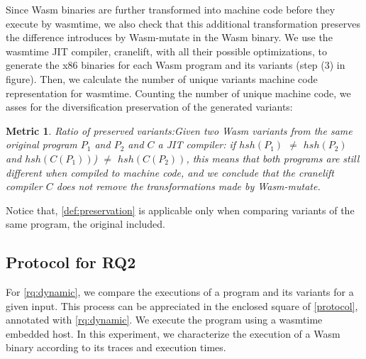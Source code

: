 \documentclass[sigplan,screen]{acmart}
\newcommand{\tool}{Wasm-mutate\xspace}
\newcommand{\wasm}{Wasm\xspace}
\newtheorem{metric}{Metric}
\begin{document}
Since \wasm binaries are further transformed into machine code before they execute by wasmtime, we also check that this additional transformation preserves the difference introduces by \tool in the \wasm binary. 
We use the wasmtime JIT compiler, cranelift, with all their possible optimizations, to generate the x86 binaries for each \wasm program and its variants  (step (3) in figure). 
Then, we calculate the number of unique variants machine code representation for wasmtime.
Counting the number of unique machine code, we asses for the diversification preservation of the generated variants: \\

\begin{metric}{Ratio of preserved variants:}\label{def:preservation}
    Given two \wasm variants from the same original program $P_1$ and $P_2$ and $C$ a JIT compiler:
    if $hsh(P_1)$ $\neq$ $hsh(P_2)$ and $hsh(C(P_1))$) $\neq$ $hsh(C(P_2))$, this means that  both programs are still different when compiled to machine code, and we conclude that the cranelift compiler $C$ does not remove the transformations made by \tool.  
    
\end{metric}

Notice that, \autoref{def:preservation} is applicable only when comparing variants of the same program, the original included. 




\subsection{Protocol for RQ2}

For \ref{rq:dynamic}, we compare  the executions of a program and its variants for a given input. 
This process can be appreciated in the enclosed square of \autoref{protocol}, annotated with \ref{rq:dynamic}.
We execute the program using a wasmtime embedded host.
In this experiment, we characterize the  execution of a \wasm binary according to its traces and execution times.
\end{document}
